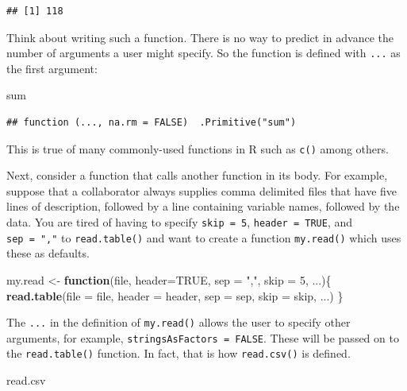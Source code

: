 \documentclass[
]{krantz}
\newenvironment{Shaded}{\begin{snugshade}}{\end{snugshade}}
\newcommand{\ControlFlowTok}[1]{\textcolor[rgb]{0.13,0.29,0.53}{\textbf{#1}}}
\newcommand{\DataTypeTok}[1]{\textcolor[rgb]{0.13,0.29,0.53}{#1}}
\newcommand{\DecValTok}[1]{\textcolor[rgb]{0.00,0.00,0.81}{#1}}
\newcommand{\KeywordTok}[1]{\textcolor[rgb]{0.13,0.29,0.53}{\textbf{#1}}}
\newcommand{\NormalTok}[1]{#1}
\newcommand{\OtherTok}[1]{\textcolor[rgb]{0.56,0.35,0.01}{#1}}
\newcommand{\StringTok}[1]{\textcolor[rgb]{0.31,0.60,0.02}{#1}}
\begin{document}
\begin{verbatim}
## [1] 118
\end{verbatim}

Think about writing such a function. There is no way to predict in advance the number of arguments a user might specify. So the function is defined with \texttt{...} as the first argument:

\begin{Shaded}
\begin{Highlighting}[]
\NormalTok{sum}
\end{Highlighting}
\end{Shaded}

\begin{verbatim}
## function (..., na.rm = FALSE)  .Primitive("sum")
\end{verbatim}

This is true of many commonly-used functions in R such as \texttt{c()} among others.

Next, consider a function that calls another function in its body. For example, suppose that a collaborator always supplies comma delimited files that have five lines of description, followed by a line containing variable names, followed by the data. You are tired of having to specify \texttt{skip\ =\ 5}, \texttt{header\ =\ TRUE}, and \texttt{sep\ =\ ","} to \texttt{read.table()} and want to create a function \texttt{my.read()} which uses these as defaults.

\begin{Shaded}
\begin{Highlighting}[]
\NormalTok{my.read \textless{}{-}}\StringTok{ }\ControlFlowTok{function}\NormalTok{(file, }\DataTypeTok{header=}\OtherTok{TRUE}\NormalTok{, }\DataTypeTok{sep =} \StringTok{","}\NormalTok{, }\DataTypeTok{skip =} \DecValTok{5}\NormalTok{, ...)\{}
    \KeywordTok{read.table}\NormalTok{(}\DataTypeTok{file =}\NormalTok{ file, }\DataTypeTok{header =}\NormalTok{ header, }\DataTypeTok{sep =}\NormalTok{ sep, }\DataTypeTok{skip =}\NormalTok{ skip, ...)}
\NormalTok{\}}
\end{Highlighting}
\end{Shaded}

The \texttt{...} in the definition of \texttt{my.read()} allows the user to specify other arguments, for example, \texttt{stringsAsFactors\ =\ FALSE}. These will be passed on to the \texttt{read.table()} function. In fact, that is how \texttt{read.csv()} is defined.

\begin{Shaded}
\begin{Highlighting}[]
\NormalTok{read.csv}
\end{Highlighting}
\end{Shaded}
\end{document}
